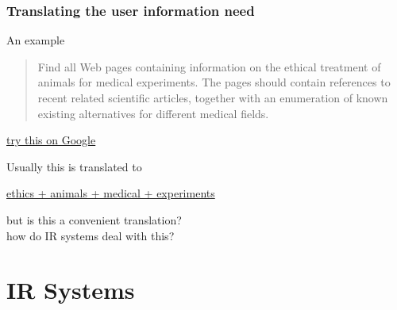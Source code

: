 \documentclass[svgnames]{beamer}
\begin{document}
\begin{frame} \frametitle{Translating the user information need}
    
    \begin{block}{An example}
        \begin{quote}
            Find all Web pages containing information on the ethical treatment of
            animals for medical experiments. The pages should contain references to
            recent related scientific articles, together with an enumeration of known
            existing alternatives for different medical fields.
        \end{quote}
        \begin{flushright}
            \small
            \href{http://www.google.pt/search?q=Find+all+Web+pages+containing+information+on+the+ethical+treatment+of\%0D\%0A++++++animals+for+medical+experiments.+The+pages+should+contain+references+to\%0D\%0A++++++recent+related+scientific+articles\%2C+together+with+an+enumeration+of+known\%0D\%0A++++++existing+alternatives+for+different+medical+fields.}{try this on Google}
        \end{flushright}
    \end{block}

    \pause

    \begin{block}{}
        Usually this is translated to
        \begin{center}
            \href{http://www.google.pt/search?q=ethics+animals+medical+experiments}{ethics + animals + medical + experiments}
        \end{center}
        \vspace{-1\baselineskip}
        \begin{flushright}
            but is this a convenient translation?\\
            how do IR systems deal with this?
        \end{flushright}
    \end{block}


\end{frame}



\section{IR Systems}
\end{document}
